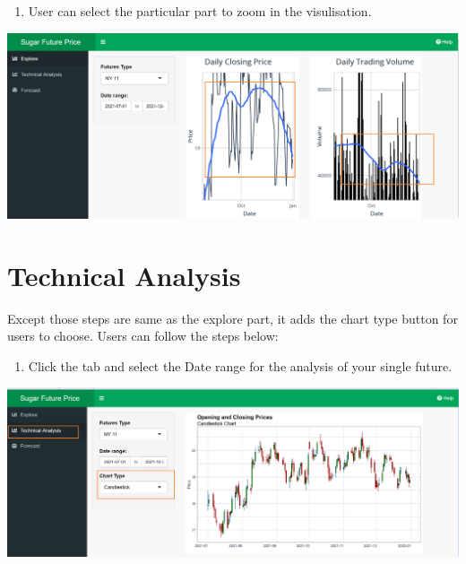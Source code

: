 \documentclass[
  12pt,
]{article}
\providecommand{\tightlist}{%
  \setlength{\itemsep}{0pt}\setlength{\parskip}{0pt}}
\begin{document}
\begin{enumerate}
\def\labelenumi{\arabic{enumi})}
\setcounter{enumi}{3}
\tightlist
\item
  User can select the particular part to zoom in the visulisation.
\end{enumerate}

\begin{center}\includegraphics[width=1\linewidth]{images/EDA3} \end{center}

\hypertarget{technical-analysis}{%
\section{Technical Analysis}\label{technical-analysis}}

Except those steps are same as the explore part, it adds the chart type
button for users to choose. Users can follow the steps below:

\begin{enumerate}
\def\labelenumi{\arabic{enumi}.}
\tightlist
\item
  Click the tab and select the Date range for the analysis of your
  single future.
\end{enumerate}

\begin{center}\includegraphics[width=1\linewidth]{images/for_1} \end{center}
\end{document}
